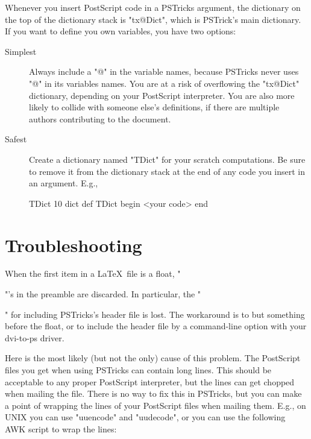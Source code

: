 Whenever you insert PostScript code in a PSTricks argument, the dictionary on
the top of the dictionary stack is "tx@Dict", which is PSTrick's main
dictionary. If you want to define you own variables, you have two options:
\begin{description}
  \item[Simplest] Always include a "@" in the variable names, because PSTricks
never uses "@" in its variables names. You are at a risk of overflowing the
"tx@Dict" dictionary, depending on your PostScript interpreter. You are also
more likely to collide with someone else's definitions, if there are multiple
authors contributing to the document.
  \item[Safest] Create a dictionary named "TDict" for your scratch
computations. Be sure to remove it from the dictionary stack at the end of any
code you insert in an argument. E.g.,
\begin{LVerb}
  TDict 10 dict def TDict begin <your code> end
\end{LVerb}
\end{description}

\section{Troubleshooting\label{troubleshooting}}
\setcounter{faq}{0}


When the first item in a \LaTeX\ file is a float, "\special"'s in the preamble
are discarded. In particular, the "\special" for including PSTricks's header
file is lost. The workaround is to but something before the float, or to
include the header file by a command-line option with your dvi-to-ps driver.


Here is the most likely (but not the only) cause of this problem. The
PostScript files you get when using PSTricks can contain long lines. This
should be acceptable to any proper PostScript interpreter, but the lines can
get chopped when mailing the file. There is no way to fix this in PSTricks,
but you can make a point of wrapping the lines of your PostScript files when
mailing them. E.g., on UNIX you can use "uuencode" and "uudecode", or you can
use the following AWK script to wrap the lines:

